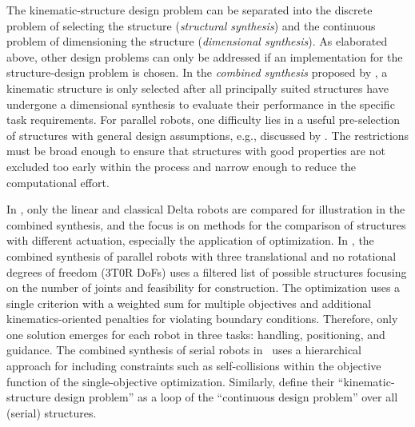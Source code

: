 The kinematic-structure design problem can be separated into the discrete problem of selecting the structure (\emph{structural synthesis}) and the continuous problem of dimensioning the structure (\emph{dimensional synthesis}).
As elaborated above, other design problems can only be addressed if an implementation for the structure-design problem is chosen.
In the \emph{combined synthesis} proposed by \cite{Krefft2006}, a kinematic structure is only selected after all principally suited structures have undergone a dimensional synthesis to evaluate their performance in the specific task requirements.
For parallel robots, one difficulty lies in a useful pre-selection of structures with general design assumptions, %
e.g., discussed by \cite{Frindt2001,Krefft2006,Prause2016}.
The restrictions must be broad enough to ensure that structures with good properties are not excluded too early within the process and narrow enough to reduce the computational effort.

In \cite{Krefft2006}, only the linear and classical Delta robots are compared for illustration in the combined synthesis, and the focus is on methods for the comparison of structures with different actuation, especially the application of  optimization.
In \cite{Prause2016}, the combined synthesis of parallel robots with three translational and no rotational degrees of freedom (3T0R DoFs) uses a filtered list of possible structures focusing on the number of joints and feasibility for construction.
The optimization uses a single criterion with a weighted sum for multiple objectives and additional kinematics-oriented penalties for violating boundary conditions.
%
Therefore, only one solution emerges for each robot in three tasks: handling, positioning, and guidance. 
The combined synthesis of serial robots in~\cite{Ramirez2018} uses a hierarchical approach for including constraints such as self-collisions within the objective function of the single-objective optimization.
Similarly, \cite{BaumgaertnerKanFle2023} define their ``kinematic-structure design problem'' as a loop of the ``continuous design problem'' over all (serial) structures.

